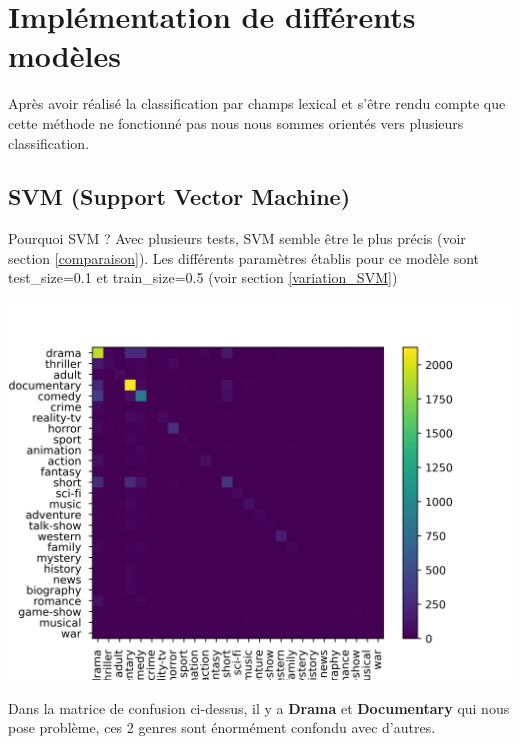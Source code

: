 \newpage
\section{Implémentation de différents modèles}

Après avoir réalisé la classification par champs lexical et s’être rendu compte que cette méthode ne fonctionné pas nous nous sommes orientés vers plusieurs classification.











\subsection{SVM (Support Vector Machine)}

Pourquoi SVM ? Avec plusieurs tests, SVM semble être le plus précis (voir section \ref{comparaison}).  
Les différents paramètres établis pour ce modèle sont test\_size=0.1 et train\_size=0.5 (voir section \ref{variation_SVM})

\begin{center}
    \includegraphics[scale=1]{graphs/confusion_matrix_LinearSVC().png}
\end{center}

Dans la matrice de confusion ci-dessus, il y a \textbf{Drama} et \textbf{Documentary} qui nous pose problème, ces 2 genres sont énormément confondu avec d'autres.













